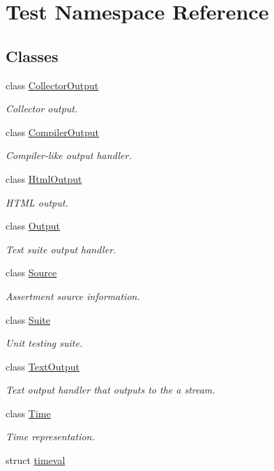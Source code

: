 \hypertarget{namespace_test}{}\section{Test Namespace Reference}
\label{namespace_test}
\subsection*{Classes}
\begin{DoxyCompactItemize}
\item 
class \hyperlink{class_test_1_1_collector_output}{Collector\+Output}
\begin{DoxyCompactList}\small\item\em Collector output. \end{DoxyCompactList}\item 
class \hyperlink{class_test_1_1_compiler_output}{Compiler\+Output}
\begin{DoxyCompactList}\small\item\em Compiler-\/like output handler. \end{DoxyCompactList}\item 
class \hyperlink{class_test_1_1_html_output}{Html\+Output}
\begin{DoxyCompactList}\small\item\em H\+T\+ML output. \end{DoxyCompactList}\item 
class \hyperlink{class_test_1_1_output}{Output}
\begin{DoxyCompactList}\small\item\em Test suite output handler. \end{DoxyCompactList}\item 
class \hyperlink{class_test_1_1_source}{Source}
\begin{DoxyCompactList}\small\item\em Assertment source information. \end{DoxyCompactList}\item 
class \hyperlink{class_test_1_1_suite}{Suite}
\begin{DoxyCompactList}\small\item\em Unit testing suite. \end{DoxyCompactList}\item 
class \hyperlink{class_test_1_1_text_output}{Text\+Output}
\begin{DoxyCompactList}\small\item\em Text output handler that outputs to the a stream. \end{DoxyCompactList}\item 
class \hyperlink{class_test_1_1_time}{Time}
\begin{DoxyCompactList}\small\item\em Time representation. \end{DoxyCompactList}\item 
struct \hyperlink{struct_test_1_1timeval}{timeval}
\end{DoxyCompactItemize}
